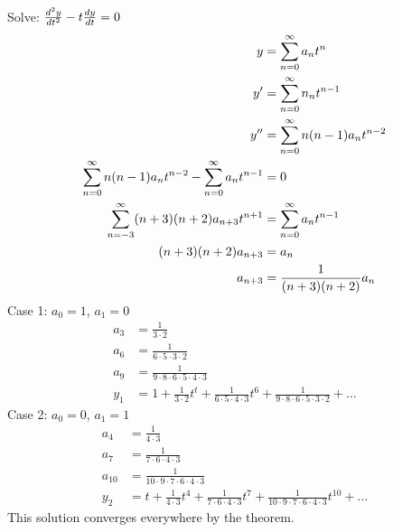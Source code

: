 \documentclass[12pt]{article}
\begin{document}
\begin{example} Solve: $\frac{d^2y}{dt^2} - t\frac{dy}{dt}  = 0$ $$\begin{aligned} y &= \sum_{n = 0}^{\infty} a_nt^n \\ y' &= \sum_{n = 0}^{\infty} n_nt^{n - 1} \\ y'' &= \sum_{n = 0}^{\infty} n(n - 1)a_nt^{n - 2} \\ \sum_{n = 0}^{\infty} n(n - 1)a_nt^{n - 2} - \sum_{n = 0}^{\infty} a_nt^{n - 1} &= 0 \\ \sum_{n = -3}^{\infty} (n + 3)(n + 2)a_{n + 3} t^{n + 1} &= \sum_{n = 0}^{\infty} a_nt^{n - 1} \\ (n + 3)(n + 2) a_{n + 3} &= a_n \\ a_{n + 3} &= \frac{1}{(n + 3)(n + 2)} a_n \end{aligned} $$ 
Case 1: $a_0 = 1$, $a_1 = 0$ $$\begin{aligned} a_3 &= \frac{1}{3 \cdot 2} \\ a_6 &= \frac{1}{6 \cdot 5 \cdot 3 \cdot 2} \\ a_9 &= \frac{1}{9 \cdot 8 \cdot 6 \cdot 5 \cdot 4 \cdot 3} \\ y_1 &= 1 + \frac{1}{3 \cdot 2}t^t + \frac{1}{6 \cdot 5 \cdot 4 \cdot 3} t^6 + \frac{1}{9 \cdot 8 \cdot 6 \cdot 5 \cdot 3 \cdot 2} + \dots \end{aligned} $$ 
Case 2: $a_0 = 0$, $a_1 = 1$ $$\begin{aligned} a_4 &= \frac{1}{4 \cdot 3} \\ a_7 &= \frac{1}{7 \cdot 6 \cdot 4 \cdot 3} \\ a_{10} &= \frac{1}{10 \cdot 9 \cdot 7 \cdot 6 \cdot 4 \cdot 3} \\ y_2 &= t + \frac{1}{4 \cdot 3}t^4 + \frac{1}{7 \cdot 6 \cdot 4 \cdot 3}t^7 + \frac{1}{10 \cdot 9 \cdot 7 \cdot 6 \cdot 4 \cdot 3} t^{10} + \dots \end{aligned} $$ 
This solution converges everywhere by the theorem. \end{example} 
\end{document}
